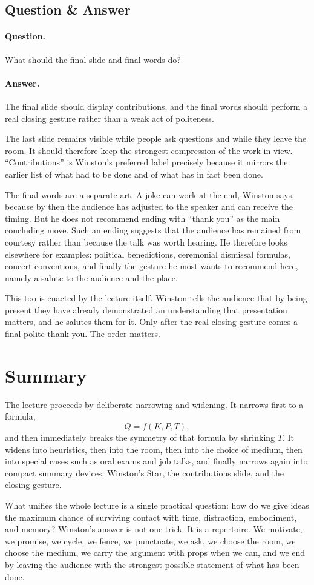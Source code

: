 \subsection{Question \& Answer}

\paragraph{Question.} What should the final slide and final words do?

\paragraph{Answer.} The final slide should display contributions, and the final words should perform a real closing gesture rather than a weak act of politeness.

The last slide remains visible while people ask questions and while they leave the room. It should therefore keep the strongest compression of the work in view. ``Contributions'' is Winston's preferred label precisely because it mirrors the earlier list of what had to be done and of what has in fact been done.

The final words are a separate art. A joke can work at the end, Winston says, because by then the audience has adjusted to the speaker and can receive the timing. But he does not recommend ending with ``thank you'' as the main concluding move. Such an ending suggests that the audience has remained from courtesy rather than because the talk was worth hearing. He therefore looks elsewhere for examples: political benedictions, ceremonial dismissal formulas, concert conventions, and finally the gesture he most wants to recommend here, namely a salute to the audience and the place.

This too is enacted by the lecture itself. Winston tells the audience that by being present they have already demonstrated an understanding that presentation matters, and he salutes them for it. Only after the real closing gesture comes a final polite thank-you. The order matters.

\section{Summary}

The lecture proceeds by deliberate narrowing and widening. It narrows first to a formula,
\[
Q=f(K,P,T),
\]
and then immediately breaks the symmetry of that formula by shrinking \(T\). It widens into heuristics, then into the room, then into the choice of medium, then into special cases such as oral exams and job talks, and finally narrows again into compact summary devices: Winston's Star, the contributions slide, and the closing gesture.

What unifies the whole lecture is a single practical question: how do we give ideas the maximum chance of surviving contact with time, distraction, embodiment, and memory? Winston's answer is not one trick. It is a repertoire. We motivate, we promise, we cycle, we fence, we punctuate, we ask, we choose the room, we choose the medium, we carry the argument with props when we can, and we end by leaving the audience with the strongest possible statement of what has been done.